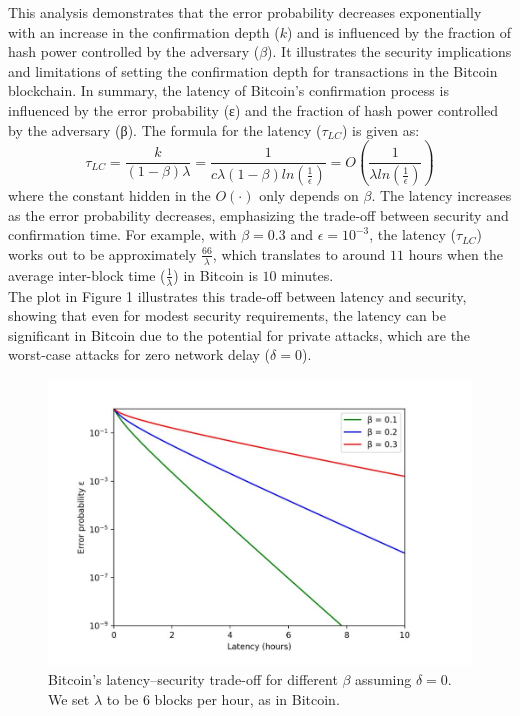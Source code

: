 \documentclass{report}
\begin{document}
This analysis demonstrates that the error probability decreases exponentially with an increase in the confirmation depth ($k$) and is influenced by the fraction of hash power controlled by the adversary ($\beta$). It illustrates the security implications and limitations of setting the confirmation depth for transactions in the Bitcoin blockchain.
In summary, the latency of Bitcoin's confirmation process is influenced by the error probability (ε) and the fraction of hash power controlled by the adversary (β). The formula for the latency ($\tau_{LC}$) is given as:
\begin{equation*}
	\tau_{LC} = \frac{k}{(1 - \beta)\lambda } = \frac{1}{c \lambda (1 - \beta) ln(\frac{1}{\epsilon})} = O(\frac{1}{\lambda ln(\frac{1}{\epsilon})})
\end{equation*}
where the constant hidden in the $O(·)$ only depends on $\beta$. The latency increases as the error probability decreases, emphasizing the trade-off between security and confirmation time.
For example, with $\beta = 0.3$ and $\epsilon = 10^{-3}$, the latency ($\tau_{LC}$) works out to be approximately $\frac{66}{\lambda}$, which translates to around $11$ hours when the average inter-block time ($\frac{1}{\lambda}$) in Bitcoin is $10$ minutes.\\
The plot in Figure 1 illustrates this trade-off between latency and security, showing that even for modest security requirements, the latency can be significant in Bitcoin due to the potential for private attacks, which are the worst-case attacks for zero network delay ($\delta = 0$).
\begin{center}
	\begin{figure}
		\centering
		\includegraphics[width=0.8\linewidth]{Fig/F1}
		\caption{Bitcoin’s latency–security trade-oﬀ for diﬀerent $\beta$ assuming $\delta = 0$. We set $\lambda$ to be $6$ blocks per hour, as in Bitcoin.}
		\label{fig:f1}
	\end{figure}
\end{center}
\end{document}
